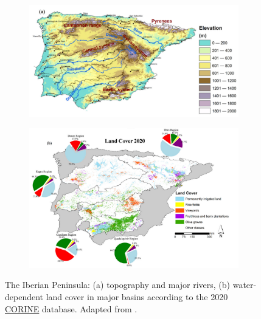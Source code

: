 \begin{figure}[hbtp]
    \centering
    \begin{subfigure}{0.8\textwidth}
        \includegraphics[width=\linewidth]{images/intro/ip_topography_fonseca_mountains.png}
    \end{subfigure}
    \begin{subfigure}{0.8\textwidth}
        \includegraphics[width=\linewidth]{images/intro/land_cover_fonseca.png}
    \end{subfigure}
    \caption{The Iberian Peninsula: (a) topography and major rivers, (b) water-dependent land cover in major basins according to the 2020 \href{https://land.copernicus.eu/en/products/corine-land-cover}{CORINE} database. Adapted from \citet{fonseca_agricultural_2022}.}
    \label{fig:IP_map_fonseca}
\end{figure}


